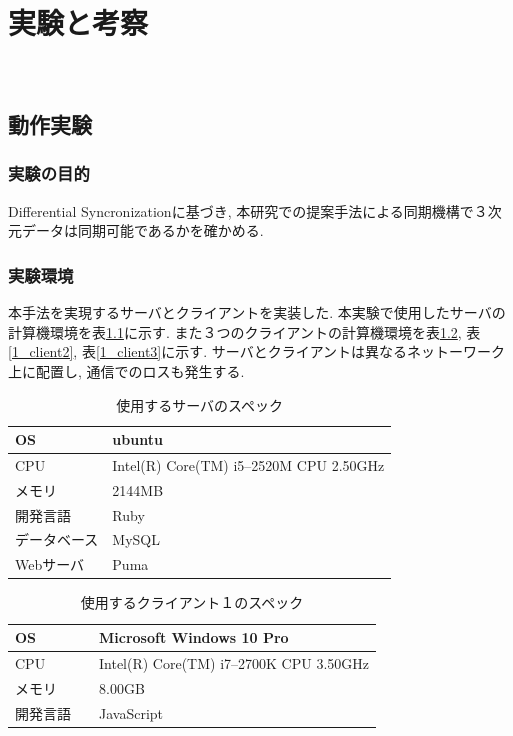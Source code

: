 \chapter{実験と考察}　\label{chap:test}
\section{動作実験}
\subsection{実験の目的}
Differential Syncronizationに基づき, 本研究での提案手法による同期機構で３次元データは同期可能であるかを確かめる.
\subsection{実験環境}
本手法を実現するサーバとクライアントを実装した. 本実験で使用したサーバの計算機環境を表\ref{1_server}に示す. また３つのクライアントの計算機環境を表\ref{1_client1}, 表\ref{1_client2}, 表\ref{1_client3}に示す.
サーバとクライアントは異なるネットーワーク上に配置し, 通信でのロスも発生する.
\begin{table}[]
\begin{center}
	\caption{使用するサーバのスペック}
	\begin{tabular}{|l|l|} \hline
		OS & ubuntu \\ \hline
		CPU &  Intel(R) Core(TM) i5--2520M CPU 2.50GHz\\ \hline
		メモリ & 2144MB \\ \hline
    開発言語　& Ruby \\ \hline
		データベース & MySQL \\ \hline
		Webサーバ & Puma\\ \hline
	\end{tabular}
	\label{1_server}
\end{center}
\end{table}
\begin{table}[]
\begin{center}
	\caption{使用するクライアント１のスペック}
	\begin{tabular}{|l|l|} \hline
		OS & Microsoft Windows 10 Pro \\ \hline
		CPU & Intel(R) Core(TM) i7--2700K CPU 3.50GHz \\ \hline
		メモリ & 8.00GB \\ \hline
    開発言語　& JavaScript \\ \hline
	\end{tabular}
	\label{1_client1}
\end{center}
\end{table}

